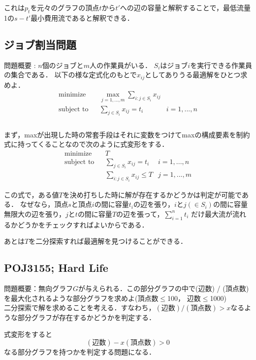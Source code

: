 \documentclass[13pt, a4paper, landscape]{jarticle}
\theoremstyle{nonitalic} %
\begin{document}
これは$p_t$を元々のグラフの頂点$t$から$t'$への辺の容量と解釈することで，最低流量1の$s-t'$最小費用流であると解釈できる．

\subsection{ジョブ割当問題}
問題概要 : $n$個のジョブと$m$人の作業員がいる．
$S_i$はジョブ$i$を実行できる作業員の集合である．
以下の様な定式化のもとで$x_{ij}$としてありうる最適解をひとつ求めよ．
\begin{align}
  &&&&& \textrm{minimize}   && \max_{j=1,...,m} \sum_{i:j \in S_i} x_{ij} \\
  &&&&& \textrm{subject to} && \sum_{j \in S_i} x_{ij} = t_i  & i=1,...,n &&&&&\\
\end{align}\\


まず，maxが出現した時の常套手段はそれに変数をつけてmaxの構成要素を制約式に持ってくることなので次のように式変形をする．
\begin{align}
  &&&&& \textrm{minimize}   && T \\
  &&&&& \textrm{subject to} && \sum_{j \in S_i} x_{ij} = t_i  & i=1,...,n &&&&&\\
  &&&&&                     &&  \sum_{i:j \in S_i} x_{ij} \leq T & j=1,...,m
\end{align}

この式で，ある値$T$を決め打ちした時に解が存在するかどうかは判定が可能である． なぜなら，頂点$s$と頂点$i$の間に容量$t_i$の辺を張り，$i$と$j (\in S_i)$の間に容量無限大の辺を張り，$j$と$t$の間に容量$T$の辺を張って，$\sum_{i=1}^n t_i $ だけ最大流が流れるかどうかをチェックすればよいからである．

あとは$T$を二分探索すれば最適解を見つけることができる．


\subsection{POJ3155; Hard Life}
問題概要：無向グラフ$G$が与えられる．この部分グラフの中で(辺数) / (頂点数)を最大化されるような部分グラフを求めよ(頂点数$\leq$100， 辺数$\leq$1000)\\

二分探索で解を求めることを考える．すなわち，$ (\textrm{辺数}) / (\textrm{頂点数})  > x$なるような部分グラフが存在するかどうかを判定する．

式変形をすると
\begin{equation}
  (\textrm{辺数}) - x (\textrm{頂点数}) > 0 \label{ineqHardLife}
\end{equation}
なる部分グラフを持つかを判定する問題になる．
\end{document}
